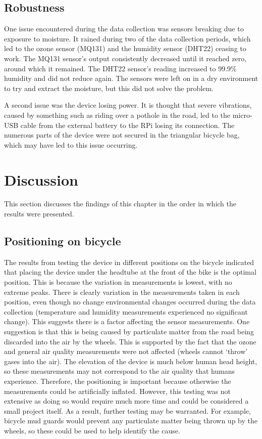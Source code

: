 \documentclass[11pt,twosided,a4paper]{report}
\begin{document}
\subsection{Robustness}

One issue encountered during the data collection was sensors breaking due to exposure to moisture. It rained during two of the data collection periods, which led to the ozone sensor (MQ131) and the humidity sensor (DHT22) ceasing to work. The MQ131 sensor's output consistently decreased until it reached zero, around which it remained. The DHT22 sensor's reading increased to 99.9\% humidity and did not reduce again. The sensors were left on in a dry environment to try and extract the moisture, but this did not solve the problem.

A second issue was the device losing power. It is thought that severe vibrations, caused by something such as riding over a pothole in the road, led to the micro-USB cable from the external battery to the RPi losing its connection. The numerous parts of the device were not secured in the triangular bicycle bag, which may have led to this issue occurring.

\section{Discussion}

This section discusses the findings of this chapter in the order in which the results were presented.

\subsection{Positioning on bicycle}

The results from testing the device in different positions on the bicycle indicated that placing the device under the headtube at the front of the bike is the optimal position. This is because the variation in measurements is lowest, with no extreme peaks. There is clearly variation in the measurements taken in each position, even though no change environmental changes occurred during the data collection (temperature and humidity measurements experienced no significant change). This suggests there is a factor affecting the sensor measurements. One suggestion is that this is being caused by particulate matter from the road being discarded into the air by the wheels. This is supported by the fact that the ozone and general air quality measurements were not affected (wheels cannot `throw' gases into the air). The elevation of the device is much below human head height, so these measurements may not correspond to the air quality that humans experience. Therefore, the positioning is important because otherwise the measurements could be artificially inflated. However, this testing was not extensive as doing so would require much more time and could be considered a small project itself. As a result, further testing may be warranted. For example, bicycle mud guards would prevent any particulate matter being thrown up by the wheels, so these could be used to help identify the cause.
\end{document}
